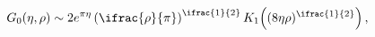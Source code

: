 \[\mathop{G_{0}\/}\nolimits\!\left(\eta,\rho\right)\sim 2e^{\pi\eta}\left(\ifrac%
{\rho}{\pi}\right)^{\ifrac{1}{2}}\mathop{K_{1}\/}\nolimits\!\left((8\eta\rho)^%
{\ifrac{1}{2}}\right),\]